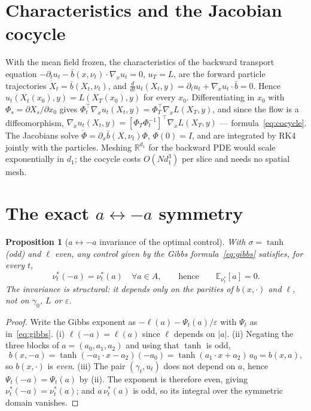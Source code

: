 \documentclass[11pt,leqno]{amsart}
\newcommand{\R}{\mathbb{R}}
\newcommand{\E}{\mathbb{E}}
\newcommand{\eps}{\varepsilon}
\DeclareMathOperator{\Tanh}{tanh}
\numberwithin{equation}{section}
\newtheorem{prop}[thm]{Proposition}
\theoremstyle{definition}
\begin{document}
\section{Characteristics and the Jacobian cocycle}
\label{app:cocycle}
With the mean field frozen, the characteristics of the backward transport
equation $-\partial_tu_t-\bar b(x,\nu_t)\cdot\nabla_xu_t=0$, $u_T=L$, are
the forward particle trajectories $\dot X_t=\bar b(X_t,\nu_t)$, and
$\frac{d}{dt}u_t(X_t,y)=\partial_tu_t+\nabla_xu_t\cdot\bar b=0$.  Hence
$u_t(X_t(x_0),y)=L(X_T(x_0),y)$ for every $x_0$.  Differentiating in $x_0$
with $\Phi_s=\partial X_s/\partial x_0$ gives
$\Phi_t^\top\nabla_xu_t(X_t,y)=\Phi_T^\top\nabla_xL(X_T,y)$, and since the
flow is a diffeomorphism, $\nabla_xu_t(X_t,y)=[\Phi_T\Phi_t^{-1}]^\top
\nabla_xL(X_T,y)$ --- formula~\eqref{eq:cocycle}.  The Jacobians solve
$\dot\Phi=\partial_x\bar b(X,\nu_t)\Phi$, $\Phi(0)=I$, and are integrated
by RK4 jointly with the particles.  Meshing $\R^{d_1}$ for the backward PDE
would scale exponentially in $d_1$; the cocycle costs $O(Nd_1^3)$ per slice
and needs no spatial mesh.

\section{The exact \texorpdfstring{$a\leftrightarrow-a$}{a <-> -a} symmetry}
\label{app:symmetry}

\begin{prop}[$a\leftrightarrow-a$ invariance of the optimal control]
\label{prop:symmetry}
With $\sigma=\Tanh$ (odd) and $\ell$ even, any control given by the Gibbs
formula~\eqref{eq:gibbs} satisfies, for every $t$,
\[
\nu^*_t(-a)=\nu^*_t(a)\quad\forall a\in A,
\qquad\text{hence}\qquad
\E_{\nu^*_t}[a]=0 .
\]
The invariance is structural: it depends only on the parities of
$b(x,\cdot)$ and $\ell$, not on $\gamma_0$, $L$ or $\eps$.
\end{prop}

\begin{proof}
Write the Gibbs exponent as $-\ell(a)-\Psi_t(a)/\eps$ with $\Psi_t$ as
in~\eqref{eq:gibbs}.  (i) $\ell(-a)=\ell(a)$ since $\ell$ depends on $|a|$.
(ii) Negating the three blocks of $a=(a_0,a_1,a_2)$ and using that $\Tanh$
is odd,
\[
b(x,-a)=\Tanh(-a_1\!\cdot\!x-a_2)(-a_0)=\Tanh(a_1\!\cdot\!x+a_2)\,a_0
=b(x,a),
\]
so $b(x,\cdot)$ is \emph{even}.  (iii) The pair $(\gamma_t,u_t)$ does not
depend on $a$, hence $\Psi_t(-a)=\Psi_t(a)$ by (ii).  The exponent is
therefore even, giving $\nu^*_t(-a)=\nu^*_t(a)$; and $a\,\nu^*_t(a)$ is odd,
so its integral over the symmetric domain vanishes.
\end{proof}
\end{document}

